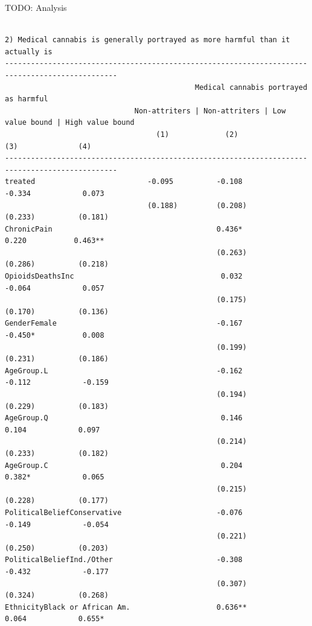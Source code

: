\documentclass[
]{article}
\begin{document}
TODO: Analysis

\pagebreak

\begin{verbatim}

2) Medical cannabis is generally portrayed as more harmful than it actually is
------------------------------------------------------------------------------------------------
                                            Medical cannabis portrayed as harmful               
                              Non-attriters | Non-attriters | Low value bound | High value bound
                                   (1)             (2)              (3)              (4)        
------------------------------------------------------------------------------------------------
treated                          -0.095          -0.108           -0.334            0.073       
                                 (0.188)         (0.208)          (0.233)          (0.181)      
ChronicPain                                      0.436*            0.220           0.463**      
                                                 (0.263)          (0.286)          (0.218)      
OpioidsDeathsInc                                  0.032           -0.064            0.057       
                                                 (0.175)          (0.170)          (0.136)      
GenderFemale                                     -0.167           -0.450*           0.008       
                                                 (0.199)          (0.231)          (0.186)      
AgeGroup.L                                       -0.162           -0.112            -0.159      
                                                 (0.194)          (0.229)          (0.183)      
AgeGroup.Q                                        0.146            0.104            0.097       
                                                 (0.214)          (0.233)          (0.182)      
AgeGroup.C                                        0.204           0.382*            0.065       
                                                 (0.215)          (0.228)          (0.177)      
PoliticalBeliefConservative                      -0.076           -0.149            -0.054      
                                                 (0.221)          (0.250)          (0.203)      
PoliticalBeliefInd./Other                        -0.308           -0.432            -0.177      
                                                 (0.307)          (0.324)          (0.268)      
EthnicityBlack or African Am.                    0.636**           0.064            0.655*      

\end{verbatim}
\end{document}
